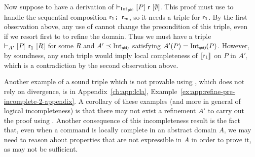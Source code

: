 \begin{example}
	Now suppose to have a derivation of $\vdash_{\text{Int}_{\neq 0}}\nobreak[P]~\mathsf{r}~[\emptyset]$. This proof must use  to handle the sequential composition $\mathsf{r}_1 \texttt{; }\mathsf{r}_w$, so it needs a triple for $\mathsf{r}_1$. By the first observation above, any use of  cannot change the precondition of this triple, even if we resort first to  to refine the domain. Thus we must have a triple $\vdash_{A'}\nobreak[P]~\mathsf{r}_1~[R]$ for some $R$ and $A' \preceq \text{Int}_{\neq 0}$ satisfying $A'(P) = \text{Int}_{\neq 0}(P)$. However, by soundness, any such triple would imply local completeness of $\llbracket\mathsf{r}_1\rrbracket$ on $P$ in $A'$, which is a contradiction by the second observation above.
\end{example}

Another example of a sound triple which is not provable using , which does not rely on divergence, is in Appendix~\ref{ch:app:lcla}, Example~\ref{ex:app:refine-pre-incomplete-2-appendix}.
A corollary of these examples (and more in general of logical incompleteness) is that there may not exist a refinement $A'$ to carry out the proof using .
Another consequence of this incompleteness result is the fact that, even when a command is locally complete in an abstract domain $A$, we may need to reason about properties that are not expressible in $A$ in order to prove it, as  may not be sufficient.

